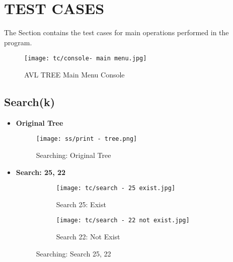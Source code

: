 \documentclass{article}
\begin{document}
\newpage

\section{TEST CASES} %
The Section contains the test cases for main operations performed in the program.
        \begin{figure}[h]
            \centering
                \texttt{[image: tc/console- main menu.jpg]}
            \caption{AVL TREE Main Menu Console}
            \label{fig:AVL_Main_Console}
        \end{figure}

\subsection{Search(k)}
\begin{itemize}
    \item \textbf{Original Tree}\newline
	    \begin{figure}[H]
            \centering
                \texttt{[image: ss/print - tree.png]}
            \caption{Searching: Original Tree}
            \label{fig:tc_Insert_Tree_initial}
        \end{figure}
    \item \textbf{Search: 25, 22 }\newline
	    \begin{figure}[H]
            \begin{subfigure}{0.5\textwidth}
                \centering
                \texttt{[image: tc/search - 25 exist.jpg]} 
                \caption{Search 25: Exist}
            \end{subfigure}
            \begin{subfigure}{0.5\textwidth}
                \centering
                \texttt{[image: tc/search - 22 not exist.jpg]}
                \caption{Search 22: Not Exist}
            \end{subfigure}
            \caption{Searching: Search 25, 22}
        \label{fig:tc_Search}
        \end{figure}  
\end{itemize}

\end{document}
